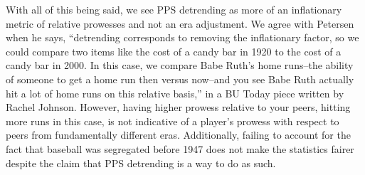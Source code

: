 \documentclass[11pt]{article}\usepackage[]{graphicx}\usepackage[]{color}
\begin{document}

With all of this being said, we see PPS detrending as more of an inflationary 
metric of relative prowesses and not an era adjustment.  
We agree with Petersen when he says, 
``detrending corresponds to removing the inflationary factor, so we could 
compare two items like the cost of a candy bar in 1920 to the cost of a 
candy bar in 2000.  In this case, we compare Babe Ruth's home runs--the 
ability of someone to get a home run then versus now--and you see Babe 
Ruth actually hit a lot of home runs on this relative basis,'' 
in a BU Today piece written by Rachel Johnson.
However, having higher prowess relative to your peers, hitting more runs in 
this case, is not indicative of a player's prowess with respect to peers from 
fundamentally different eras.  Additionally, failing to account for the fact 
that baseball was segregated before 1947 does not make the statistics fairer 
despite the claim that PPS detrending is a way to do as such.




\end{document}
